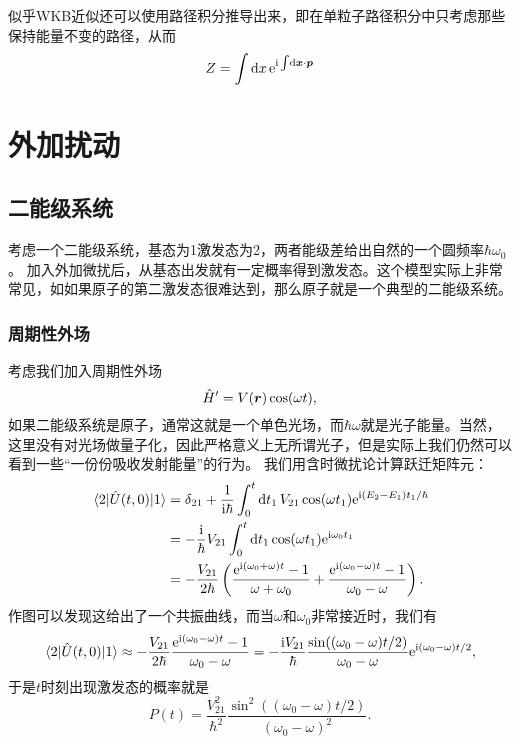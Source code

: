 \documentclass[UTF8, a4paper]{ctexart}
\newcommand*{\ee}{\mathrm{e}}
\newcommand*{\ii}{\mathrm{i}}
\begin{document}
似乎WKB近似还可以使用路径积分推导出来，即在单粒子路径积分中只考虑那些保持能量不变的路径，从而
\begin{equation}
    Z = \int \dd{x} \ee^{\ii \int \dd{\vb*{x}} \cdot \vb*{p}}
\end{equation}

\section{外加扰动}

\subsection{二能级系统}

考虑一个二能级系统，基态为1激发态为2，两者能级差给出自然的一个圆频率$\hbar \omega_0$。
加入外加微扰后，从基态出发就有一定概率得到激发态。这个模型实际上非常常见，如如果原子的第二激发态很难达到，那么原子就是一个典型的二能级系统。

\subsubsection{周期性外场}

考虑我们加入周期性外场
\begin{equation}
    \hat{H}' = V(\vb*{r}) \cos(\omega t),
\end{equation}
如果二能级系统是原子，通常这就是一个单色光场，而$\hbar \omega$就是光子能量。当然，这里没有对光场做量子化，因此严格意义上无所谓光子，但是实际上我们仍然可以看到一些“一份份吸收发射能量”的行为。
我们用含时微扰论计算跃迁矩阵元：
\begin{equation}
    \begin{aligned}
        \mel*{2}{\hat{U}(t, 0)}{1} &= \delta_{21} + \frac{1}{\ii \hbar} \int_0^t \dd{t_1} V_{21} \cos(\omega t_1) \ee^{\ii (E_2 - E_1) t_1 / \hbar} \\
        &= - \frac{\ii}{\hbar} V_{21} \int_0^t \dd{t_1} \cos(\omega t_1) \ee^{\ii \omega_0 t_1} \\
        &= - \frac{V_{21}}{2 \hbar} \left( \frac{\ee^{\ii (\omega_0 + \omega) t} - 1}{\omega + \omega_0} + \frac{\ee^{\ii (\omega_0 - \omega) t} - 1}{\omega_0 - \omega} \right).
    \end{aligned}
\end{equation}
作图可以发现这给出了一个共振曲线，而当$\omega$和$\omega_0$非常接近时，我们有
\begin{equation}
    \mel*{2}{\hat{U}(t, 0)}{1} \approx - \frac{V_{21}}{2 \hbar} \frac{\ee^{\ii (\omega_0 - \omega) t} - 1}{\omega_0 - \omega} = - \frac{\ii V_{21}}{\hbar} \frac{\sin((\omega_0-\omega)t/2)}{\omega_0 - \omega} \ee^{\ii (\omega_0 - \omega) t / 2},
\end{equation}
于是$t$时刻出现激发态的概率就是
\begin{equation}
    P(t) = \frac{V_{21}^2}{\hbar^2} \frac{\sin^2((\omega_0 - \omega) t /2)}{(\omega_0 - \omega)^2}.
\end{equation}
\end{document}

